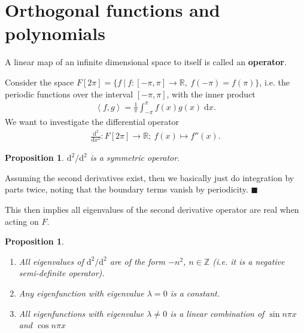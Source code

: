 \documentclass[letter-paper]{tufte-book}
\newtheorem{proposition}[theorem]{\color{pastel-blue}Proposition}
\newenvironment{proof}[1][Proof]{\begin{trivlist}
\item[\hskip \labelsep {\bfseries #1}]}{\end{trivlist}}
\newcommand{\inner}[2]{\left\langle #1, #2\right\rangle}
\newcommand{\qed}{\hfill$\blacksquare$}
\begin{document}
\section{Orthogonal functions and polynomials}

A linear map of an infinite dimensional space to itself is called an \textbf{operator}.

Consider the space $F[2\pi] = \{ f\ |\ f:[-\pi, \pi] \to \mathbb{R},\ f(-\pi) = f(\pi)\}$, i.e. the periodic functions over the interval $[-\pi, \pi]$, with the inner product
\begin{align*}
  \inner{f}{g} = \frac{1}{\pi} \int_{-\pi}^\pi f(x)g(x)\; \mathrm{d}x.
\end{align*}
We want to investigate the differential operator
\begin{align*}
  \frac{\mathrm{d}^2}{\mathrm{d}x^2} : F[2\pi] \to \mathbb{R};\ f(x) \mapsto f''(x).
\end{align*}

\begin{proposition}
  $\mathrm{d}^2 / \mathrm{d}^2$ is a symmetric operator.
\end{proposition}

\begin{proof}
  Assuming the second derivatives exist, then we basically just do integration by parts twice, noting that the boundary terms vanish by periodicity. \qed
\end{proof}

This then implies all eigenvalues of the second derivative operator are real when acting on $F$.

\begin{proposition}
  \begin{enumerate}
    \item All eigenvalues of $\mathrm{d}^2 / \mathrm{d}^2$ are of the form $-n^2$, $n\in\mathbb{Z}$ (i.e. it is a negative semi-definite operator).
    \item Any eigenfunction with eigenvalue $\lambda=0$ is a constant.
    \item All eigenfunctions with eigenvalue $\lambda\neq 0$ is a linear combination of $\sin n\pi x$ and $\cos n\pi x$ 
  \end{enumerate}
\end{proposition}
\end{document}
